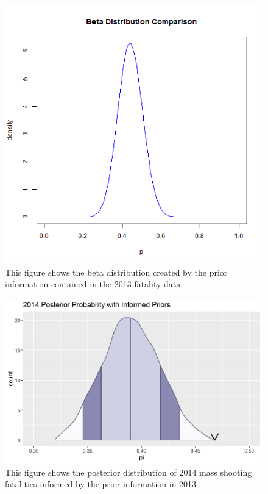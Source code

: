 \documentclass{article}
\begin{document}
\begin{figure}[!h]
    \centering
    \includegraphics[scale=.5]{Figure6.png}
    \caption{This figure shows the beta distribution created by the prior information contained in the 2013 fatality data}
    \label{fig:6}
\end{figure}

\begin{figure}[!h]
    \centering
    \includegraphics[scale=.5]{Figure7.png}
    \caption{This figure shows the posterior distribution of 2014 mass shooting fatalities informed by the prior information in 2013}
    \label{fig:7}
\end{figure}
\end{document}
